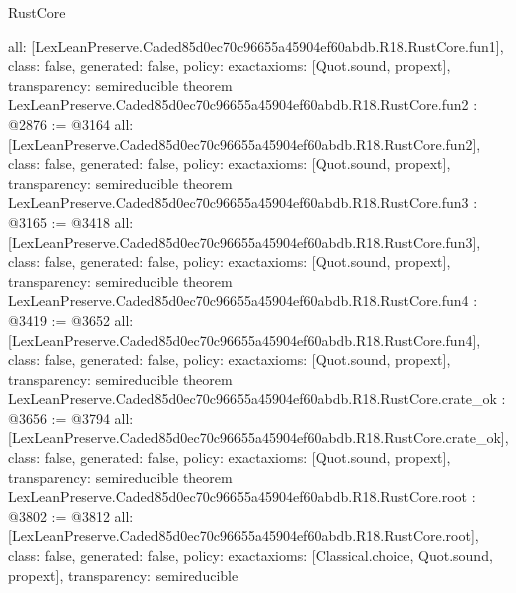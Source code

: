 \begin{lexlean}{RustCore}
\begin{coremodule}
{  all: [LexLeanPreserve.Caded85d0ec70c96655a45904ef60abdb.R18.RustCore.fun1],
  class: false,
  generated: false,
  policy: exact{axioms: [Quot.sound, propext]},
  transparency: semireducible
}
theorem LexLeanPreserve.Caded85d0ec70c96655a45904ef60abdb.R18.RustCore.fun2 : @2876 := @3164 {
  all: [LexLeanPreserve.Caded85d0ec70c96655a45904ef60abdb.R18.RustCore.fun2],
  class: false,
  generated: false,
  policy: exact{axioms: [Quot.sound, propext]},
  transparency: semireducible
}
theorem LexLeanPreserve.Caded85d0ec70c96655a45904ef60abdb.R18.RustCore.fun3 : @3165 := @3418 {
  all: [LexLeanPreserve.Caded85d0ec70c96655a45904ef60abdb.R18.RustCore.fun3],
  class: false,
  generated: false,
  policy: exact{axioms: [Quot.sound, propext]},
  transparency: semireducible
}
theorem LexLeanPreserve.Caded85d0ec70c96655a45904ef60abdb.R18.RustCore.fun4 : @3419 := @3652 {
  all: [LexLeanPreserve.Caded85d0ec70c96655a45904ef60abdb.R18.RustCore.fun4],
  class: false,
  generated: false,
  policy: exact{axioms: [Quot.sound, propext]},
  transparency: semireducible
}
theorem LexLeanPreserve.Caded85d0ec70c96655a45904ef60abdb.R18.RustCore.crate_ok : @3656 := @3794 {
  all: [LexLeanPreserve.Caded85d0ec70c96655a45904ef60abdb.R18.RustCore.crate_ok],
  class: false,
  generated: false,
  policy: exact{axioms: [Quot.sound, propext]},
  transparency: semireducible
}
theorem LexLeanPreserve.Caded85d0ec70c96655a45904ef60abdb.R18.RustCore.root : @3802 := @3812 {
  all: [LexLeanPreserve.Caded85d0ec70c96655a45904ef60abdb.R18.RustCore.root],
  class: false,
  generated: false,
  policy: exact{axioms: [Classical.choice, Quot.sound, propext]},
  transparency: semireducible
}


\end{coremodule}
\end{lexlean}
